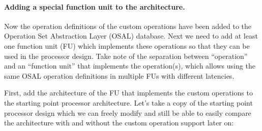 \documentclass[a4paper,twoside]{tceusermanual}
\begin{document}
% 

\paragraph{Adding a special function unit to the architecture.}

Now the operation definitions of the custom operations have been added to the
Operation Set Abstraction Layer (OSAL) database. Next we need to add at
least one function unit (FU) which implements these operations so that they
can be used in the processor design. Take note of the separation between ``operation'' and
an ``function unit'' that implements the operation(s), which allows using the
same OSAL operation definitions in multiple FUs with different latencies.

First, add the architecture of the FU that implements the custom operations
to the starting point processor architecture. Let's take a copy of the starting
point processor design which we can freely modify and still be able to easily
compare the architecture with and without the custom operation support later on:
\end{document}
